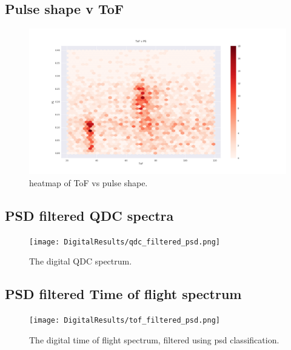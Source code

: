 \documentclass[main.tex]{subfiles}
\begin{document}
\subsection{Pulse shape v ToF}
\begin{figure}[ht]
    \centering
        \includegraphics[scale=.35]{DigitalResults/tof_ps_d.png}
        \caption{heatmap of ToF vs pulse shape.}
    \label{fig:tof_ps_d} 
\end{figure}

\newpage
\subsection{PSD filtered QDC spectra}
\begin{figure}[ht]
    \centering
        \texttt{[image: DigitalResults/qdc\_filtered\_psd.png]}
        \caption{The digital QDC spectrum.}
    \label{fig:D_QDC}
\end{figure}

\newpage
\subsection{PSD filtered Time of flight spectrum}
\begin{figure}[ht!]
    \centering
        \texttt{[image: DigitalResults/tof\_filtered\_psd.png]}
        \caption{The digital time of flight spectrum, filtered using psd classification.}
    \label{fig:D_PSD_TOF} 
\end{figure}
\end{document}
